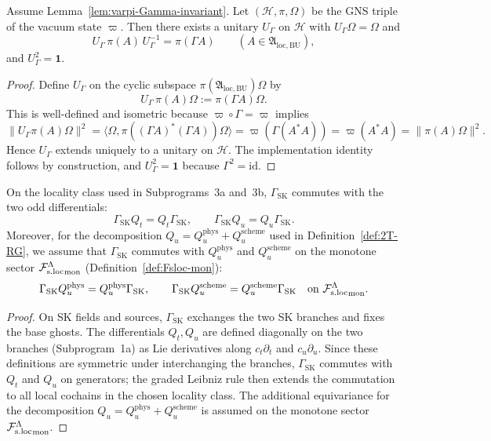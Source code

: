 \begin{lemma}
\label{lem:Gamma-implemented}
Assume Lemma~\ref{lem:varpi-Gamma-invariant}. Let $(\mathcal H,\pi,\Omega)$ be
the GNS triple of the vacuum state $\varpi$.
Then there exists a unitary $U_\Gamma$ on $\mathcal H$ with
$U_\Gamma\Omega=\Omega$ and
\[
U_\Gamma\,\pi(A)\,U_\Gamma^{-1}=\pi(\Gamma A)
\qquad(A\in\mathfrak A_{\mathrm{loc,BU}}),
\]
and $U_\Gamma^2=\mathbf 1$.
\end{lemma}

\begin{proof}
Define $U_\Gamma$ on the cyclic subspace $\pi(\mathfrak A_{\mathrm{loc,BU}})\Omega$
by
\[
U_\Gamma\,\pi(A)\Omega := \pi(\Gamma A)\Omega.
\]
This is well-defined and isometric because $\varpi\circ\Gamma=\varpi$ implies
\[
\|U_\Gamma\pi(A)\Omega\|^2
=\langle\Omega,\pi((\Gamma A)^*(\Gamma A))\Omega\rangle
=\varpi(\Gamma(A^*A))=\varpi(A^*A)=\|\pi(A)\Omega\|^2.
\]
Hence $U_\Gamma$ extends uniquely to a unitary on $\mathcal H$. The
implementation identity follows by construction, and $U_\Gamma^2=\mathbf 1$
because $\Gamma^2=\mathrm{id}$.
\end{proof}

\begin{lemma}
\label{lem:GammaSK-comm}
On the locality class used in Subprograms~3a and~3b, $\Gamma_{\mathrm{SK}}$ commutes with
the two odd differentials:
\[
\Gamma_{\mathrm{SK}}Q_t = Q_t\Gamma_{\mathrm{SK}},\qquad
\Gamma_{\mathrm{SK}}Q_u = Q_u\Gamma_{\mathrm{SK}}.
\]
Moreover, for the decomposition $Q_u=Q_u^{\mathrm{phys}}+Q_u^{\mathrm{scheme}}$
used in Definition~\ref{def:2T-RG}, we assume that $\Gamma_{\mathrm{SK}}$
commutes with $Q_u^{\mathrm{phys}}$ and $Q_u^{\mathrm{scheme}}$ on the monotone sector
${\mathcal F_{\mathrm{s.loc}}^\Lambda}_{\mathrm{mon}}$ (Definition~\ref{def:Fsloc-mon}):
\[
\Gamma_{\mathrm{SK}}Q_u^{\mathrm{phys}} = Q_u^{\mathrm{phys}}\Gamma_{\mathrm{SK}},
\qquad
\Gamma_{\mathrm{SK}}Q_u^{\mathrm{scheme}} = Q_u^{\mathrm{scheme}}\Gamma_{\mathrm{SK}}
\quad\text{on }{\mathcal F_{\mathrm{s.loc}}^\Lambda}_{\mathrm{mon}}.
\]
\end{lemma}

\begin{proof}
On SK fields and sources, $\Gamma_{\mathrm{SK}}$ exchanges the two SK branches
and fixes the base ghosts. The differentials $Q_t,Q_u$ are defined diagonally
on the two branches (Subprogram~1a) as Lie derivatives along
$c_t\partial_t$ and $c_u\partial_u$. Since these definitions are symmetric under
interchanging the branches, $\Gamma_{\mathrm{SK}}$ commutes with $Q_t$ and $Q_u$
on generators; the graded Leibniz rule then extends the commutation to all
local cochains in the chosen locality class.
The additional equivariance for the decomposition $Q_u=Q_u^{\mathrm{phys}}+Q_u^{\mathrm{scheme}}$
is assumed on the monotone sector ${\mathcal F_{\mathrm{s.loc}}^\Lambda}_{\mathrm{mon}}$.
\end{proof}

